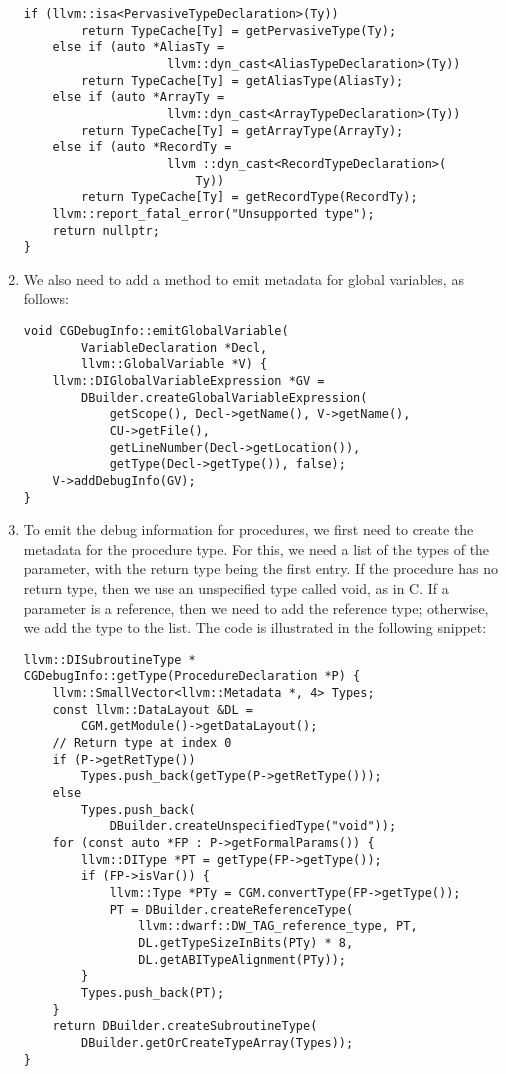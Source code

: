 \begin{enumerate}
\begin{lstlisting}[caption={}]
	if (llvm::isa<PervasiveTypeDeclaration>(Ty))
		return TypeCache[Ty] = getPervasiveType(Ty);
	else if (auto *AliasTy =
					llvm::dyn_cast<AliasTypeDeclaration>(Ty))
		return TypeCache[Ty] = getAliasType(AliasTy);
	else if (auto *ArrayTy =
					llvm::dyn_cast<ArrayTypeDeclaration>(Ty))
		return TypeCache[Ty] = getArrayType(ArrayTy);
	else if (auto *RecordTy =
					llvm ::dyn_cast<RecordTypeDeclaration>(
						Ty))
		return TypeCache[Ty] = getRecordType(RecordTy);
	llvm::report_fatal_error("Unsupported type");
	return nullptr;
}
\end{lstlisting}

\item We also need to add a method to emit metadata for global variables, as follows:
\begin{lstlisting}[caption={}]
void CGDebugInfo::emitGlobalVariable(
		VariableDeclaration *Decl,
		llvm::GlobalVariable *V) {
	llvm::DIGlobalVariableExpression *GV =	
		DBuilder.createGlobalVariableExpression(
			getScope(), Decl->getName(), V->getName(),
			CU->getFile(),
			getLineNumber(Decl->getLocation()),
			getType(Decl->getType()), false);
	V->addDebugInfo(GV);
}
\end{lstlisting}

\item To emit the debug information for procedures, we first need to create the metadata for the procedure type. For this, we need a list of the types of the parameter, with the return type being the first entry. If the procedure has no return type, then we use an unspecified type called void, as in C. If a parameter is a reference, then we need to add the reference type; otherwise, we add the type to the list. The code is illustrated in the following snippet:
\begin{lstlisting}[caption={}]
llvm::DISubroutineType *
CGDebugInfo::getType(ProcedureDeclaration *P) {
	llvm::SmallVector<llvm::Metadata *, 4> Types;
	const llvm::DataLayout &DL =
		CGM.getModule()->getDataLayout();
	// Return type at index 0
	if (P->getRetType())
		Types.push_back(getType(P->getRetType()));
	else
		Types.push_back(
			DBuilder.createUnspecifiedType("void"));
	for (const auto *FP : P->getFormalParams()) {
		llvm::DIType *PT = getType(FP->getType());
		if (FP->isVar()) {
			llvm::Type *PTy = CGM.convertType(FP->getType());
			PT = DBuilder.createReferenceType(
				llvm::dwarf::DW_TAG_reference_type, PT,
				DL.getTypeSizeInBits(PTy) * 8,
				DL.getABITypeAlignment(PTy));
		}
		Types.push_back(PT);
	}
	return DBuilder.createSubroutineType(
		DBuilder.getOrCreateTypeArray(Types));
}
\end{lstlisting}


\end{enumerate}
